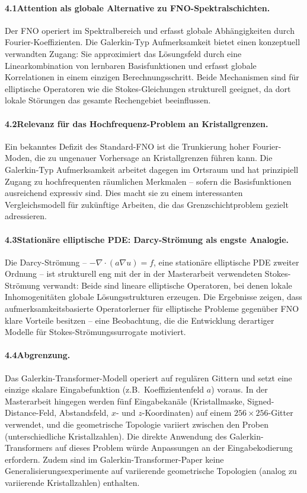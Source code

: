 \documentclass[a4paper,12pt]{article}
\begin{document}
\paragraph{4.1\quad Attention als globale Alternative zu FNO-Spektralschichten.}
Der FNO operiert im Spektralbereich und erfasst globale Abhängigkeiten durch Fourier-Koeffizienten.
Die Galerkin-Typ Aufmerksamkeit bietet einen konzeptuell verwandten Zugang: Sie approximiert
das Lösungsfeld durch eine Linearkombination von lernbaren Basisfunktionen und erfasst
globale Korrelationen in einem einzigen Berechnungsschritt. Beide Mechanismen sind für
elliptische Operatoren wie die Stokes-Gleichungen strukturell geeignet, da dort lokale Störungen
das gesamte Rechengebiet beeinflussen.

\paragraph{4.2\quad Relevanz für das Hochfrequenz-Problem an Kristallgrenzen.}
Ein bekanntes Defizit des Standard-FNO ist die Trunkierung hoher Fourier-Moden, die zu
ungenauer Vorhersage an Kristallgrenzen führen kann. Die Galerkin-Typ Aufmerksamkeit
arbeitet dagegen im Ortsraum und hat prinzipiell Zugang zu hochfrequenten räumlichen
Merkmalen -- sofern die Basisfunktionen ausreichend expressiv sind. Dies macht sie zu einem
interessanten Vergleichsmodell für zukünftige Arbeiten, die das Grenzschichtproblem
gezielt adressieren.

\paragraph{4.3\quad Stationäre elliptische PDE: Darcy-Strömung als engste Analogie.}
Die Darcy-Strömung -- $-\nabla \cdot (a \nabla u) = f$, eine stationäre elliptische PDE
zweiter Ordnung -- ist strukturell eng mit der in der Masterarbeit verwendeten
Stokes-Strömung verwandt: Beide sind lineare elliptische Operatoren, bei denen lokale
Inhomogenitäten globale Lösungsstrukturen erzeugen. Die Ergebnisse zeigen, dass
aufmerksamkeitsbasierte Operatorlerner für elliptische Probleme gegenüber FNO
klare Vorteile besitzen -- eine Beobachtung, die die Entwicklung derartiger Modelle
für Stokes-Strömungssurrogate motiviert.

\paragraph{4.4\quad Abgrenzung.}
Das Galerkin-Transformer-Modell operiert auf regulären Gittern und setzt eine einzige
skalare Eingabefunktion (z.B.\ Koeffizientenfeld $a$) voraus. In der Masterarbeit hingegen
werden fünf Eingabekanäle (Kristallmaske, Signed-Distance-Feld, Abstandsfeld, $x$- und
$z$-Koordinaten) auf einem $256 \times 256$-Gitter verwendet, und die geometrische Topologie
variiert zwischen den Proben (unterschiedliche Kristallzahlen). Die direkte Anwendung des
Galerkin-Transformers auf dieses Problem würde Anpassungen an der Eingabekodierung
erfordern. Zudem sind im Galerkin-Transformer-Paper keine Generalisierungsexperimente
auf variierende geometrische Topologien (analog zu variierende Kristallzahlen) enthalten.
\end{document}
